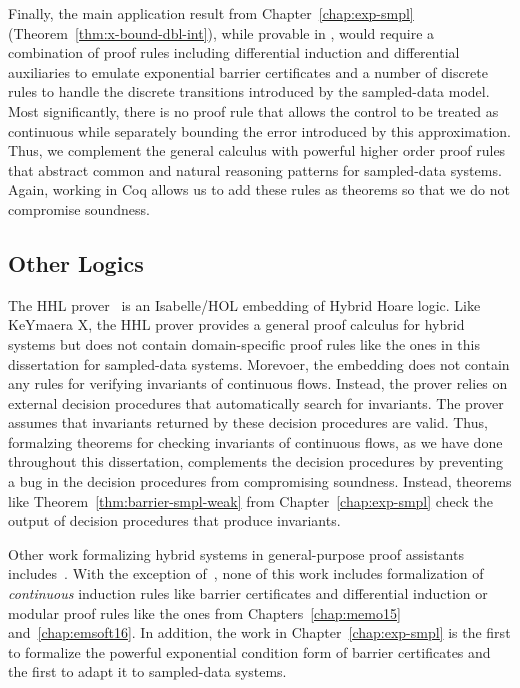 Finally, the main application result from Chapter~\ref{chap:exp-smpl}
(Theorem~\ref{thm:x-bound-dbl-int}), while provable in \dL{}, would require
a combination of proof rules including differential induction and
differential auxiliaries to emulate exponential barrier certificates and a
number of discrete rules to handle the discrete transitions introduced by
the sampled-data model. Most significantly, there is no proof rule that
allows the control to be treated as continuous while separately bounding
the error introduced by this approximation. Thus, we complement the general
\dL{} calculus with powerful higher order proof rules that abstract common
and natural reasoning patterns for sampled-data systems. Again, working in
Coq allows us to add these rules as theorems so that we do not compromise
soundness.

\subsection{Other Logics}
\label{sec:related-logic-other}
The HHL prover~\cite{LiuHHL10,WangHHL2015} is an Isabelle/HOL embedding of
Hybrid Hoare logic. Like KeYmaera X, the HHL prover provides a general
proof calculus for hybrid systems but does not contain domain-specific
proof rules like the ones in this dissertation for sampled-data
systems. Morevoer, the embedding does not contain any rules for verifying
invariants of continuous flows. Instead, the prover relies on external
decision procedures that automatically search for invariants. The prover
assumes that invariants returned by these decision procedures are
valid. Thus, formalzing theorems for checking invariants of continuous
flows, as we have done throughout this dissertation, complements the
decision procedures by preventing a bug in the decision procedures from
compromising soundness. Instead, theorems like
Theorem~\ref{thm:barrier-smpl-weak} from Chapter~\ref{chap:exp-smpl} check
the output of decision procedures that produce invariants.

Other work formalizing hybrid systems in general-purpose proof assistants
includes~\cite{volker2000towards,mumm-hybrid-pvs,Niqui2008,GeuversKSW10,Collins10ataylor,anand2015roscoq,arechigainvcuts15,Bohrer17-verified-dl}.
With the exception of~\cite{Bohrer17-verified-dl}, none of this work
includes formalization of \emph{continuous} induction rules like barrier
certificates and differential induction or modular proof rules like the
ones from Chapters~\ref{chap:memo15} and~\ref{chap:emsoft16}. In addition,
the work in Chapter~\ref{chap:exp-smpl} is the first to formalize the
powerful exponential condition form of barrier certificates and the first
to adapt it to sampled-data systems.

